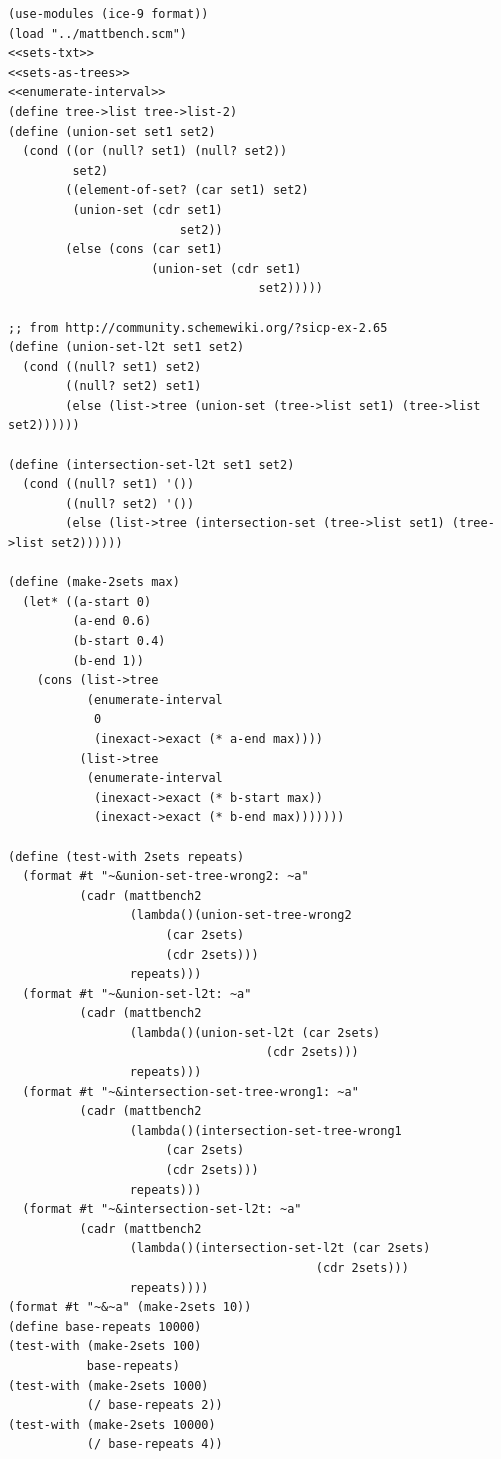 \documentclass[final,fleqn,titlepage,twoside]{article}
\begin{document}
\begin{verbatim}
(use-modules (ice-9 format))
(load "../mattbench.scm")
<<sets-txt>>
<<sets-as-trees>>
<<enumerate-interval>>
(define tree->list tree->list-2)
(define (union-set set1 set2)
  (cond ((or (null? set1) (null? set2))
         set2)
        ((element-of-set? (car set1) set2)
         (union-set (cdr set1)
                        set2))
        (else (cons (car set1)
                    (union-set (cdr set1)
                                   set2)))))

;; from http://community.schemewiki.org/?sicp-ex-2.65
(define (union-set-l2t set1 set2)
  (cond ((null? set1) set2)
        ((null? set2) set1)
        (else (list->tree (union-set (tree->list set1) (tree->list set2))))))

(define (intersection-set-l2t set1 set2)
  (cond ((null? set1) '())
        ((null? set2) '())
        (else (list->tree (intersection-set (tree->list set1) (tree->list set2))))))

(define (make-2sets max)
  (let* ((a-start 0)
         (a-end 0.6)
         (b-start 0.4)
         (b-end 1))
    (cons (list->tree
           (enumerate-interval
            0
            (inexact->exact (* a-end max))))
          (list->tree
           (enumerate-interval
            (inexact->exact (* b-start max))
            (inexact->exact (* b-end max)))))))

(define (test-with 2sets repeats)
  (format #t "~&union-set-tree-wrong2: ~a"
          (cadr (mattbench2
                 (lambda()(union-set-tree-wrong2
                      (car 2sets)
                      (cdr 2sets)))
                 repeats)))
  (format #t "~&union-set-l2t: ~a"
          (cadr (mattbench2
                 (lambda()(union-set-l2t (car 2sets)
                                    (cdr 2sets)))
                 repeats)))
  (format #t "~&intersection-set-tree-wrong1: ~a"
          (cadr (mattbench2
                 (lambda()(intersection-set-tree-wrong1
                      (car 2sets)
                      (cdr 2sets)))
                 repeats)))
  (format #t "~&intersection-set-l2t: ~a"
          (cadr (mattbench2
                 (lambda()(intersection-set-l2t (car 2sets)
                                           (cdr 2sets)))
                 repeats))))
(format #t "~&~a" (make-2sets 10))
(define base-repeats 10000)
(test-with (make-2sets 100)
           base-repeats)
(test-with (make-2sets 1000)
           (/ base-repeats 2))
(test-with (make-2sets 10000)
           (/ base-repeats 4))
\end{verbatim}
\end{document}
